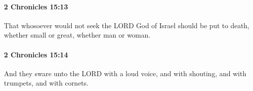 		\paragraph{2 Chronicles 15:13} %
			\label{2CHRONICLES-15-13}

			That whosoever would not seek the LORD God of Israel should be put to death, whether small or great, whether man or woman.


		\paragraph{2 Chronicles 15:14} %
			\label{2CHRONICLES-15-14}

			And they sware unto the LORD with a loud voice, and with shouting, and with trumpets, and with cornets.



